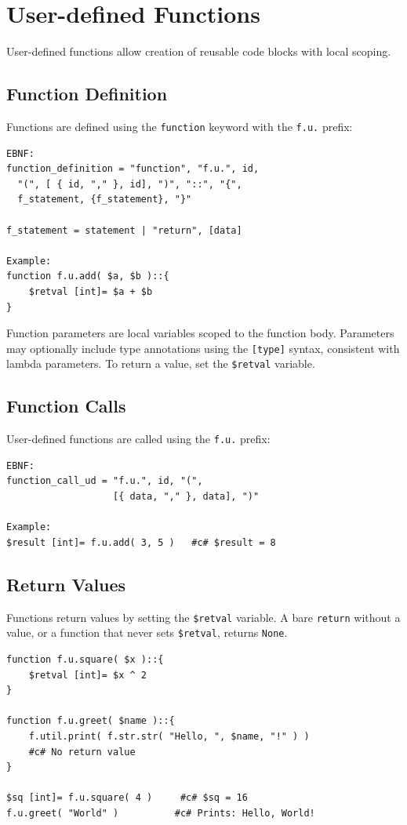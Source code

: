 \section{User-defined Functions}
User-defined functions allow creation of reusable code blocks with local scoping.

\subsection{Function Definition}
Functions are defined using the \texttt{function} keyword with the \texttt{f.u.} prefix:
\begin{verbatim}
EBNF:
function_definition = "function", "f.u.", id, 
  "(", [ { id, "," }, id], ")", "::", "{", 
  f_statement, {f_statement}, "}"

f_statement = statement | "return", [data]

Example:
function f.u.add( $a, $b )::{
    $retval [int]= $a + $b
}
\end{verbatim}

Function parameters are local variables scoped to the function body. Parameters may optionally include type annotations using the \texttt{[type]} syntax, consistent with lambda parameters. To return a value, set the \texttt{\$retval} variable.

\subsection{Function Calls}
User-defined functions are called using the \texttt{f.u.} prefix:
\begin{verbatim}
EBNF:
function_call_ud = "f.u.", id, "(", 
                   [{ data, "," }, data], ")"

Example:
$result [int]= f.u.add( 3, 5 )   #c# $result = 8
\end{verbatim}

\subsection{Return Values}
Functions return values by setting the \texttt{\$retval} variable. A bare \texttt{return} without a value, or a function that never sets \texttt{\$retval}, returns \texttt{None}.
\begin{verbatim}
function f.u.square( $x )::{
    $retval [int]= $x ^ 2
}

function f.u.greet( $name )::{
    f.util.print( f.str.str( "Hello, ", $name, "!" ) )
    #c# No return value
}

$sq [int]= f.u.square( 4 )     #c# $sq = 16
f.u.greet( "World" )          #c# Prints: Hello, World!
\end{verbatim}

